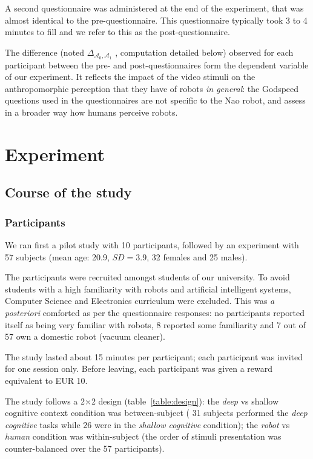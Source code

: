 \documentclass[lettersize, noapacite, twoside, HRI]{apa_HRI}
\newcommand{\deltaant}{{ $\Delta_{\mathcal{A}_0,\mathcal{A}_1}$ }}
\begin{document}
A second questionnaire was administered at the end of the experiment, that was
almost identical to the pre-questionnaire.  This questionnaire typically took 3
to 4 minutes to fill and we refer to this as the post-questionnaire.

The difference (noted \deltaant, computation detailed below) observed for
each participant between the pre- and post-questionnaires form the dependent
variable of our experiment. It reflects the impact of the video stimuli on the
anthropomorphic perception that they have of robots \emph{in general}: the
Godspeed questions used in the questionnaires are not specific to the Nao robot,
and assess in a broader way how humans perceive robots.

\section{Experiment}

\subsection{Course of the study}

\subsubsection{Participants}

We ran first a pilot study with 10 participants, followed by an experiment with
57 subjects (mean age: 20.9, $SD=3.9$, 32 females and 25 males).

The participants were recruited amongst students of our university. To avoid
students with a high familiarity with robots and artificial intelligent systems,
Computer Science and Electronics curriculum were excluded. This was \textit{a
posteriori} comforted as per the questionnaire responses: no participants
reported itself as being very familiar with robots, 8 reported some familiarity
and 7 out of 57 own a domestic robot (vacuum cleaner).

The study lasted about 15 minutes per participant; each participant was invited
for one session only. Before leaving, each participant was given a reward
equivalent to EUR 10.

The study follows a 2$\times$2 design (table~\ref{table:design}): the
\emph{deep} vs {shallow cognitive context} condition was between-subject ( 31
subjects performed the \emph{deep cognitive} tasks while 26 were in the
\emph{shallow cognitive} condition); the \emph{robot} vs \emph{human} condition
was within-subject (the order of stimuli presentation was counter-balanced over
the 57 participants).
\end{document}
